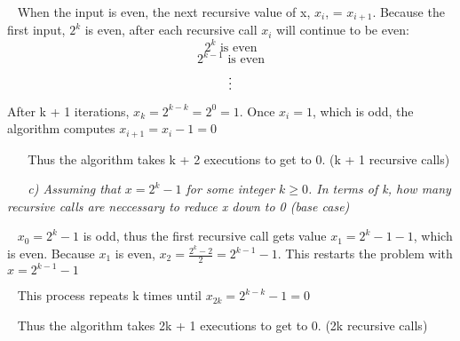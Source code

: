 \documentclass[12pt, letterpaper]{article}
\begin{document}
\begin{enumerate}
    \-\ \newline
    \textnormal{When the input is even, the next recursive value of x, \(x_i\), = \(x_{i + 1}\). Because the first input, \(2^k\) is even, after each recursive call \(x_i\) will continue to be even: }
    \[ 2^k \text{  is even} \]
    \[ 2^{k - 1} \text{  is even} \]
    \[ \text{\vdots} \]

    \textnormal{After k + 1 iterations, \( x_k = 2^{k - k} = 2^0 = 1 \). Once \(x_i = 1\), which is odd, the algorithm computes \(x_{i + 1} = x_{i} - 1 = 0 \)}

    \-\ \newline
    \-\ \newline
    \textnormal{Thus the algorithm takes k + 2 executions to get to 0. (k + 1 recursive calls)}


    \-\ \newline
    \-\ \newline
    \it{ c) Assuming that \(x = 2^k - 1\) for some integer \(k \ge 0\). In terms of k, how many recursive calls are neccessary to reduce x down to 0 (base case) }

    \-\ \newline
    \textnormal{ \(x_0 = 2^k - 1\) is odd, thus the first recursive call gets value \(x_1 = 2^k - 1 - 1\), which is even. Because \(x_1\) is even, \( x_2 = \frac{2^k - 2}{2} = 2^{k-1} - 1 \). This restarts the problem with \( x = 2^{k - 1} - 1  \) }

    \-\ \newline
    \textnormal{ This process repeats k times until \( x_{2k} = 2^{k - k} - 1 = 0\)}

    \-\ \newline
    \textnormal{ Thus the algorithm takes 2k + 1 executions to get to 0. (2k recursive calls) }




\end{enumerate}
\end{document}
